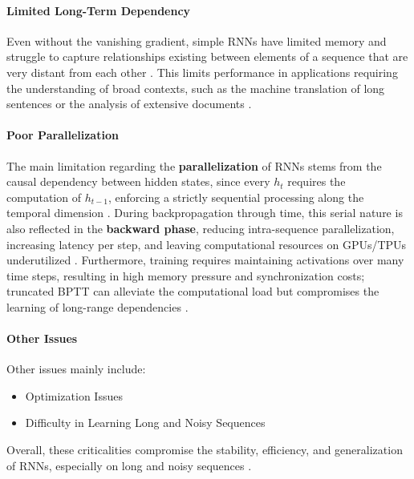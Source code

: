 \paragraph{Limited Long-Term Dependency}
Even without the vanishing gradient, simple RNNs have limited memory and struggle to capture relationships existing between elements of a sequence that are very distant from each other \cite{cs231n-rnn, quarkml-rnn-explained}. This limits performance in applications requiring the understanding of broad contexts, such as the machine translation of long sentences or the analysis of extensive documents \cite{analyticsvidhya}.

\paragraph{Poor Parallelization}
The main limitation regarding the \textbf{parallelization} of RNNs stems from the causal dependency between hidden states, since every $h_t$ requires the computation of $h_{t-1}$, enforcing a strictly sequential processing along the temporal dimension \cite{cs231n-rnn}. During backpropagation through time, this serial nature is also reflected in the \textbf{backward phase}, reducing intra-sequence parallelization, increasing latency per step, and leaving computational resources on GPUs/TPUs underutilized \cite{quarkml-bptt}. Furthermore, training requires maintaining activations over many time steps, resulting in high memory pressure and synchronization costs; truncated BPTT can alleviate the computational load but compromises the learning of long-range dependencies \cite{quarkml-rnn-explained}.

\paragraph{Other Issues}
Other issues mainly include:

\begin{itemize}
\item Optimization Issues \cite{analyticsvidhya}
\item Difficulty in Learning Long and Noisy Sequences \cite{medium_math_rnn}
\end{itemize}

Overall, these criticalities compromise the stability, efficiency, and generalization of RNNs, especially on long and noisy sequences \cite{cs231n-rnn, analyticsvidhya}.




